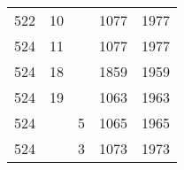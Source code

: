 \documentclass[a4paper,11pt]{article}
\begin{document}
\begin{center}
\begin{tabular}{|c|c|c|c|c|}
    522 & 10 & & 1077 & 1977 \\
    524 & 11 & & 1077 & 1977 \\
    524 & 18 & & 1859 & 1959 \\
    524 & 19 & & 1063 & 1963 \\
    524 & & \hphantom{0}5 & 1065 & 1965 \\
    524 & & \hphantom{0}3 & 1073 & 1973 \\
    \hline
  \end{tabular}

\end{center}

\vspace{\spaceTwo}
\end{document}
